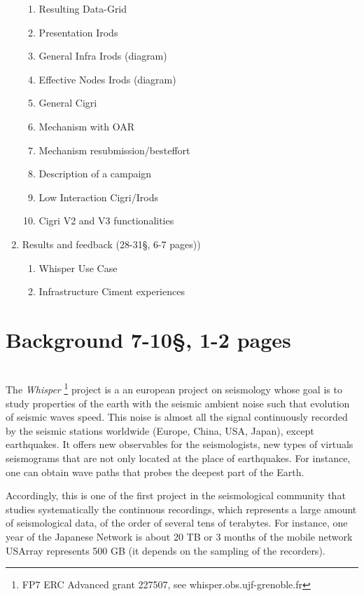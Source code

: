\documentclass[a4paper, 10pt]{article}
\begin{document}
\begin{multicols}{2}
\begin{enumerate}
\begin{enumerate}
  	  \item Resulting Data-Grid
      \item Presentation Irods
	  \item General Infra Irods (diagram)
	  \item Effective Nodes Irods (diagram)
  	  \item General Cigri
  	  \item Mechanism with OAR
  	  \item Mechanism resubmission/besteffort
  	  \item Description of a campaign
  	  \item Low Interaction Cigri/Irods
  	  \item Cigri V2 and V3 functionalities
  	\end{enumerate}
  \item Results and feedback (28-31\S, 6-7 pages))
      \begin{enumerate}
	    \item Whisper Use Case
        \item Infrastructure Ciment experiences
       \end{enumerate}
\end{enumerate}

\newpage
\section{Background 7-10\S, 1-2 pages}
~\\




The \emph{Whisper} \footnote{FP7 ERC Advanced grant 227507, see whisper.obs.ujf-grenoble.fr} 
project is a an european project on seismology whose goal is to study properties of the earth
with the seismic ambient noise such that evolution of seismic waves speed. 
This noise is almost all the signal continuously recorded by
the seismic stations worldwide (Europe, China, USA, Japan), except earthquakes. It offers new
observables for the seismologists, new types of virtuals seismograms that are not only located at the 
place of earthquakes. For instance, one can obtain wave paths that probes the deepest part of the Earth.

 
Accordingly, this is one of the first project in the seismological community that studies
systematically the continuous recordings, which represents a large amount of seismological data, 
of the order of several tens of terabytes.
For instance, one year of the Japanese Network is about 20 TB or 3 months of the mobile network
USArray represents 500 GB (it depends on the sampling of the recorders).



\end{multicols}
\end{document}
